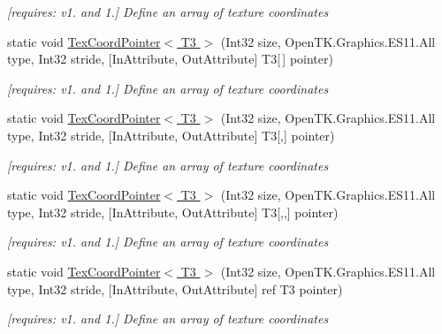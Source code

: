 \begin{DoxyCompactItemize}
\begin{DoxyCompactList}\small\item\em \mbox{[}requires\-: v1. and 1.\mbox{]} Define an array of texture coordinates \end{DoxyCompactList}\item 
static void \hyperlink{class_open_t_k_1_1_graphics_1_1_e_s11_1_1_g_l_add761c8df8a504bc6aad7bcd002f5684}{Tex\-Coord\-Pointer$<$ T3 $>$} (Int32 size, Open\-T\-K.\-Graphics.\-E\-S11.\-All type, Int32 stride, \mbox{[}In\-Attribute, Out\-Attribute\mbox{]} T3\mbox{[}$\,$\mbox{]} pointer)
\begin{DoxyCompactList}\small\item\em \mbox{[}requires\-: v1. and 1.\mbox{]} Define an array of texture coordinates \end{DoxyCompactList}\item 
static void \hyperlink{class_open_t_k_1_1_graphics_1_1_e_s11_1_1_g_l_a443d38cca1ab031ce0007facdee00889}{Tex\-Coord\-Pointer$<$ T3 $>$} (Int32 size, Open\-T\-K.\-Graphics.\-E\-S11.\-All type, Int32 stride, \mbox{[}In\-Attribute, Out\-Attribute\mbox{]} T3\mbox{[},\mbox{]} pointer)
\begin{DoxyCompactList}\small\item\em \mbox{[}requires\-: v1. and 1.\mbox{]} Define an array of texture coordinates \end{DoxyCompactList}\item 
static void \hyperlink{class_open_t_k_1_1_graphics_1_1_e_s11_1_1_g_l_a0a2ff7e8892b7f45680955d836fdc90c}{Tex\-Coord\-Pointer$<$ T3 $>$} (Int32 size, Open\-T\-K.\-Graphics.\-E\-S11.\-All type, Int32 stride, \mbox{[}In\-Attribute, Out\-Attribute\mbox{]} T3\mbox{[},,\mbox{]} pointer)
\begin{DoxyCompactList}\small\item\em \mbox{[}requires\-: v1. and 1.\mbox{]} Define an array of texture coordinates \end{DoxyCompactList}\item 
static void \hyperlink{class_open_t_k_1_1_graphics_1_1_e_s11_1_1_g_l_a3af30535a677ae6cc4fc476258b6bcd1}{Tex\-Coord\-Pointer$<$ T3 $>$} (Int32 size, Open\-T\-K.\-Graphics.\-E\-S11.\-All type, Int32 stride, \mbox{[}In\-Attribute, Out\-Attribute\mbox{]} ref T3 pointer)
\begin{DoxyCompactList}\small\item\em \mbox{[}requires\-: v1. and 1.\mbox{]} Define an array of texture coordinates \end{DoxyCompactList}\item 

\end{DoxyCompactItemize}
